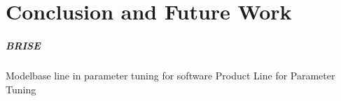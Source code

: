 \chapter{Conclusion and Future Work}\label{sec:conclusion}



         \paragraph{BRISE}
         Modelbase line in parameter tuning for software Product Line for Parameter Tuning